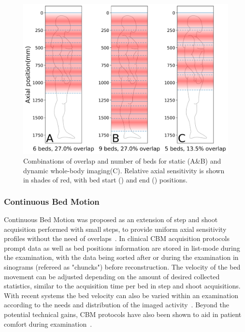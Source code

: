 \begin{figure} [ht!]
\centering
\includegraphics[scale=0.5,angle=0]{3_Results/3_1_DWB_Optimization/figures/SensitivityProfiles_overHuman.png}
\caption{Combinations of overlap and number of beds for static (A\&B) and dynamic whole-body imaging(C). Relative axial sensitivity is shown in shades of red, with bed start (\protect{}) and end (\protect{}) positions.} 
\label{fig3_1:BodyCoverage}
\end{figure}



\subsubsection{Continuous Bed Motion}
Continuous Bed Motion was proposed as an extension of step and shoot acquisition performed with small steps, to provide uniform axial sensitivity profiles without the need of overlaps~\cite{Dahlbom2001,Brasse2002}. In clinical CBM acquisition protocols prompt data as well as bed positions information are stored in list-mode during the examination, with the data being sorted after or during the examination in sinograms (refereed as "chuncks") before reconstruction. The velocity of the bed movement can be adjusted depending on the amount of desired collected statistics, similar to the acquisition time per bed in step and shoot acquisitions. With recent systems the bed velocity can also be varied within an examination according to the needs and distribution of the imaged activity~\cite{Panin2014}. Beyond the potential technical gains, CBM protocols have also been shown to aid in patient comfort during examination~\cite{Schatka2016}. 

